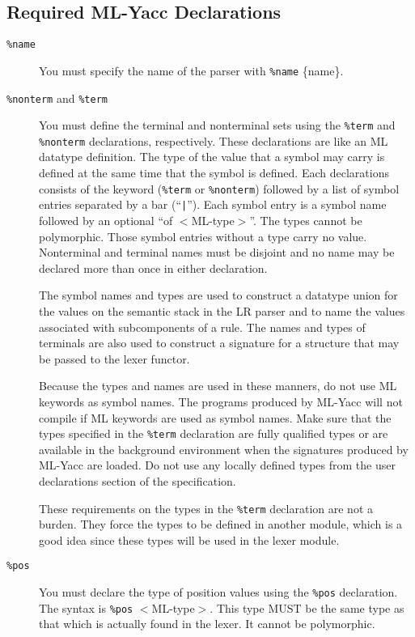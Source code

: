 \subsection{Required ML-Yacc Declarations}
\begin{description}
\item[{\tt \%name}]
You must specify the name of the parser with {\tt \%name} \{name\}.
\item[{\tt \%nonterm} and {\tt \%term}]
You must define the terminal and nonterminal sets using the 
{\tt \%term} and {\tt \%nonterm}
declarations, respectively.  These declarations are like an ML datatype
definition.
The type of the value that a symbol may carry is defined at the same time
that the symbol is defined.  Each declarations consists of the keyword
({\tt \%term} or {\tt \%nonterm})
followed by a list of symbol entries separated by a bar (``{\tt |}'').
Each symbol entry is a symbol name followed by an optional 
``of \/ $<$ML-type$>$''. The types cannot be polymorphic.
Those symbol entries without a type carry no value.
Nonterminal and terminal names must be disjoint and no name may be declared
more than once in either declaration.

The symbol names and types are used to construct a datatype union for the
values on the semantic stack in the LR parser and to name the values
associated with subcomponents of a rule.  The names and types of 
terminals are also used to construct a signature for a structure that
may be passed to the lexer functor.

Because the types and names are used in these manners, do
not use ML keywords as symbol names.   The programs produced by ML-Yacc
will not compile if ML keywords are used as symbol names.  
Make sure that the types specified in the {\tt \%term} declaration are
fully qualified types or are available in the background
environment when the signatures produced by ML-Yacc are loaded.  Do
not use any locally defined types from the user declarations section of
the specification.

These requirements on the types in the {\tt \%term} declaration are not
a burden.
They force the types to be defined in another module,
which is a good idea since these types will
be used in the lexer module.
\item[{\tt \%pos}]
You must declare the type of position values using the {\tt \%pos} declaration.
The syntax is {\tt \%pos} $<$ML-type$>$.
This type MUST be the same type as that which is actually found in the lexer.
It cannot be polymorphic.

\end{description}

